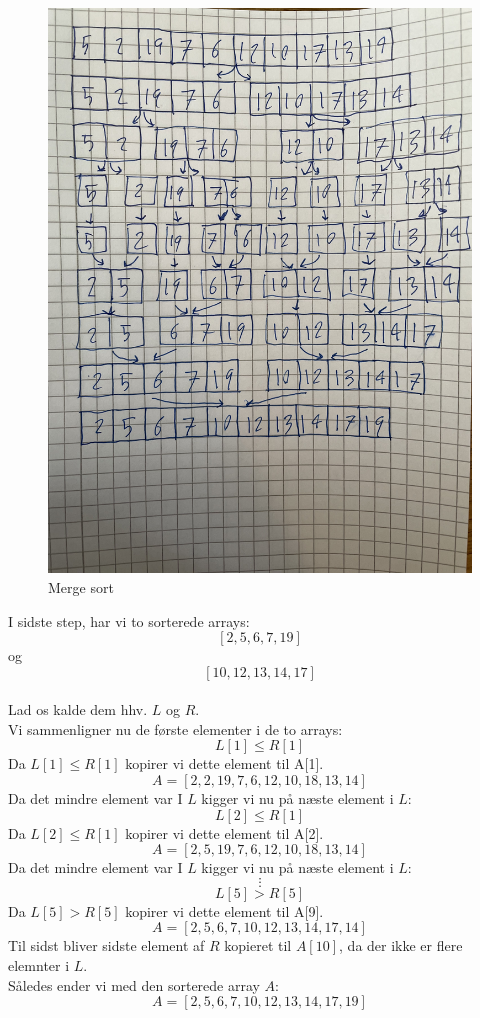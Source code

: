 \documentclass[a4paper,12pt]{article}
\begin{document}
\begin{figure}[H]
    \centering  
    \includegraphics[width=1\textwidth, angle=-90]{IMG_2075.jpg}
    \caption{Merge sort}
\end{figure}
\par
I sidste step, har vi to sorterede arrays:\\
\[[2, 5, 6, 7, 19]\] og \[[10, 12, 13, 14, 17]\] \\
Lad os kalde dem hhv. $L$ og $R$.\\
Vi sammenligner nu de første elementer i de to arrays:\\
\[L[1] \leq R[1]\]
Da $L[1] \leq R[1]$ kopirer vi dette element til A[1].\\
\[A = [2, 2, 19, 7, 6, 12, 10, 18, 13, 14]\]
Da det mindre element var I $L$ kigger vi nu på næste element i $L$:
\[L[2] \leq R[1]\]
Da $L[2] \leq R[1]$ kopirer vi dette element til A[2].\\
\[A = [2, 5, 19, 7, 6, 12, 10, 18, 13, 14]\]
Da det mindre element var I $L$ kigger vi nu på næste element i $L$:
\[\vdots\]
\[L[5] > R[5]\]
Da $L[5] > R[5]$ kopirer vi dette element til A[9].\\
\[A = [2, 5, 6, 7, 10, 12, 13, 14, 17, 14]\]
Til sidst bliver sidste element af $R$ kopieret til $A[10]$, da der ikke er flere elemnter i $L$.\\
Således ender vi med den sorterede array $A$:\\
\[A = [2, 5, 6, 7, 10, 12, 13, 14, 17, 19]\]
\end{document}
